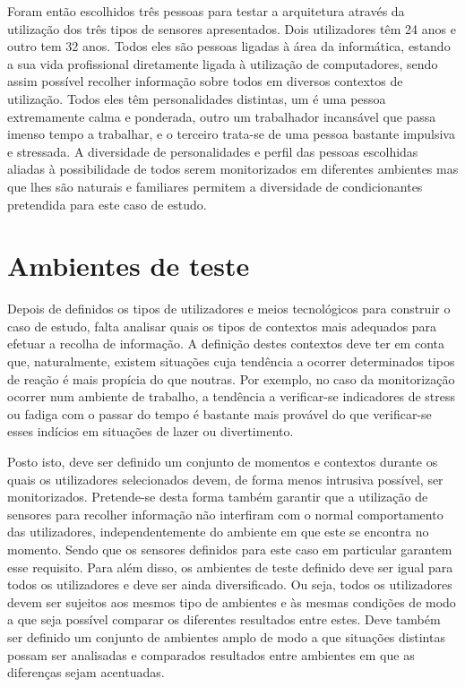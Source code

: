 Foram então escolhidos três pessoas para testar a arquitetura através da utilização dos três tipos de sensores apresentados. Dois utilizadores têm 24 anos e outro tem 32 anos. Todos eles são pessoas ligadas à área da informática, estando a sua vida profissional diretamente ligada à utilização de computadores, sendo assim possível recolher informação sobre todos em diversos contextos de utilização. Todos eles têm personalidades distintas, um é uma pessoa extremamente calma e ponderada, outro um trabalhador incansável que passa imenso tempo a trabalhar, e o terceiro trata-se de uma pessoa bastante impulsiva e stressada. A diversidade de personalidades e perfil das pessoas escolhidas aliadas à possibilidade de todos serem monitorizados em diferentes ambientes mas que lhes são naturais e familiares permitem a diversidade de condicionantes pretendida para este caso de estudo.


\section{Ambientes de teste}

Depois de definidos os tipos de utilizadores e meios tecnológicos para construir o caso de estudo, falta analisar quais os tipos de contextos mais adequados para efetuar a recolha de informação. A definição destes contextos deve ter em conta que, naturalmente, existem situações cuja tendência a ocorrer determinados tipos de reação é mais propícia do que noutras. Por exemplo, no caso da monitorização ocorrer num ambiente de trabalho, a tendência a verificar-se indicadores de stress ou fadiga com o passar do tempo é bastante mais provável do que verificar-se esses indícios em situações de lazer ou divertimento.

Posto isto, deve ser definido um conjunto de momentos e contextos durante os quais os utilizadores selecionados devem, de forma menos intrusiva possível, ser monitorizados. Pretende-se desta forma também garantir que a utilização de sensores para recolher informação não interfiram com o normal comportamento das utilizadores, independentemente do ambiente em que este se encontra no momento. Sendo que os sensores definidos para este caso em particular garantem esse requisito. Para além disso, os ambientes de teste definido deve ser igual para todos os utilizadores e deve ser ainda diversificado. Ou seja, todos os utilizadores devem ser sujeitos aos mesmos tipo de ambientes e às mesmas condições de modo a que seja possível comparar os diferentes resultados entre estes. Deve também ser definido um conjunto de ambientes amplo de modo
a que situações distintas possam ser analisadas e comparados resultados entre ambientes em que as diferenças sejam acentuadas.

